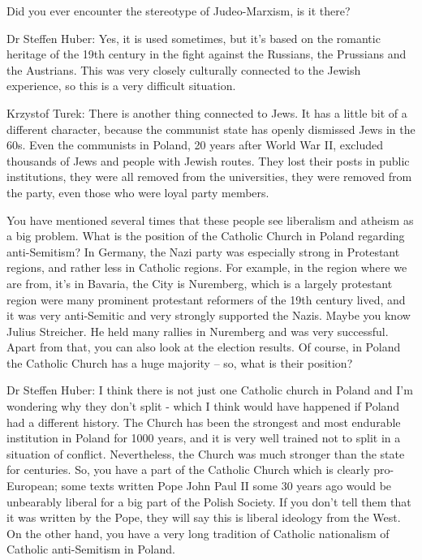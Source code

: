  

Did you ever encounter the stereotype of Judeo-Marxism, is it there? 

 

Dr Steffen Huber: Yes, it is used sometimes, but it's based on the romantic heritage of the 19th century in the fight against the Russians, the Prussians and the Austrians. This was very closely culturally connected to the Jewish experience, so this is a very difficult situation. 

Krzystof Turek: There is another thing connected to Jews. It has a little bit of a different character, because the communist state has openly dismissed Jews in the 60s. Even the communists in Poland, 20 years after World War II, excluded thousands of Jews and people with Jewish routes. They lost their posts in public institutions, they were all removed from the universities, they were removed from the party, even those who were loyal party members. 

  

You have mentioned several times that these people see liberalism and atheism as a big problem. What is the position of the Catholic Church in Poland regarding anti-Semitism? In Germany, the Nazi party was especially strong in Protestant regions, and rather less in Catholic regions. For example, in the region where we are from, it's in Bavaria, the City is Nuremberg, which is a largely protestant region were many prominent protestant reformers of the 19th century lived, and it was very anti-Semitic and very strongly supported the Nazis. Maybe you know Julius Streicher. He held many rallies in Nuremberg and was very successful. Apart from that, you can also look at the election results. Of course, in Poland the Catholic Church has a huge majority – so, what is their position? 

 

 

Dr Steffen Huber: I think there is not just one Catholic church in Poland and I'm wondering why they don't split - which I think would have happened if Poland had a different history. The Church has been the strongest and most endurable institution in Poland for 1000 years, and it is very well trained not to split in a situation of conflict. Nevertheless, the Church was much stronger than the state for centuries. So, you have a part of the Catholic Church which is clearly pro-European; some texts written Pope John Paul II some 30 years ago would be unbearably liberal for a big part of the Polish Society. If you don't tell them that it was written by the Pope, they will say this is liberal ideology from the West. On the other hand, you have a very long tradition of Catholic nationalism of Catholic anti-Semitism in Poland. 

